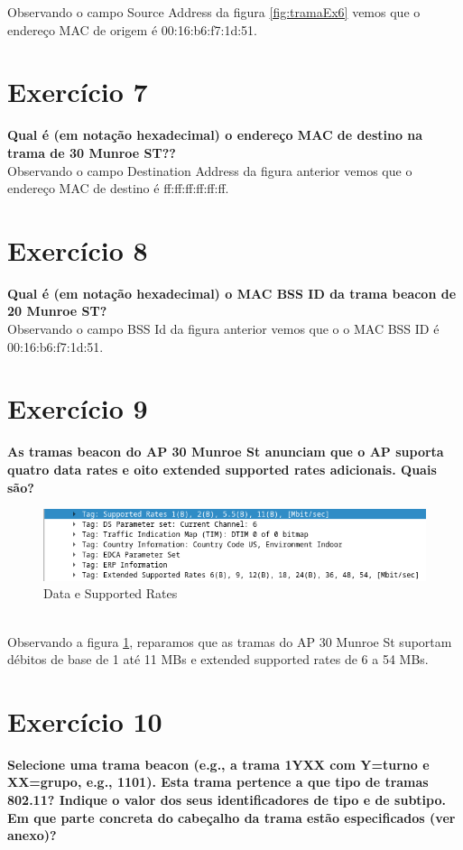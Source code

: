 \documentclass[a4paper]{report}
\begin{document}
Observando o campo Source Address da figura \ref{fig:tramaEx6} vemos que o
endereço MAC de origem é 00:16:b6:f7:1d:51.

\section{Exercício 7}
\textbf{Qual é (em notação hexadecimal) o endereço MAC de destino na trama de 30
    Munroe ST??}\\

Observando o campo Destination Address da figura anterior vemos que o endereço
MAC de destino é ff:ff:ff:ff:ff:ff.

\section{Exercício 8}
\textbf{Qual é (em notação hexadecimal) o MAC BSS ID da trama beacon de 20
    Munroe ST?}\\

Observando o campo BSS Id da figura anterior vemos que o o MAC BSS ID é
00:16:b6:f7:1d:51.

\section{Exercício 9}
\textbf{As tramas beacon do AP 30 Munroe St anunciam que o AP suporta quatro
    data rates e oito extended supported rates adicionais. Quais são?}\\

\begin{figure}[H]
    \centering 
    \includegraphics[width=\textwidth]{images/supportedRatesEx9.png}  
    \caption{Data e Supported Rates}
    \label{fig:supportedRatesEx9}
\end{figure}\\

Observando a figura \ref{fig:supportedRatesEx9}, reparamos que as tramas do AP
30 Munroe St suportam débitos de base de 1 até 11 MBs e extended supported rates de
6 a 54 MBs.

\section{Exercício 10}
\textbf{Selecione uma trama beacon (e.g., a trama 1YXX com Y=turno e XX=grupo,
    e.g., 1101). Esta trama pertence a que tipo de tramas 802.11? Indique o
    valor dos seus identificadores de tipo e de subtipo. Em que parte concreta
    do cabeçalho da trama estão especificados (ver anexo)?}\\
\end{document}
